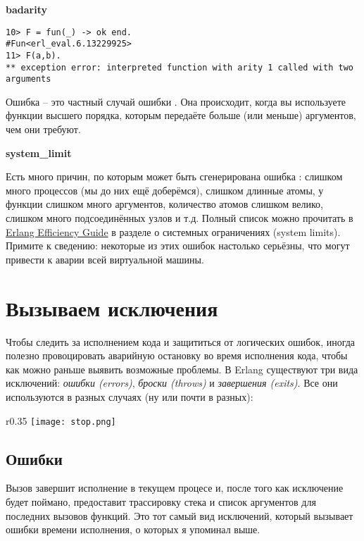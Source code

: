 \textbf{badarity}
\begin{lstlisting}[style=erlang]
10> F = fun(_) -> ok end.
#Fun<erl_eval.6.13229925>
11> F(a,b).
** exception error: interpreted function with arity 1 called with two arguments
\end{lstlisting}

Ошибка  \--- это частный случай ошибки . 
Она происходит, когда вы используете функции высшего порядка, которым передаёте больше (или меньше) аргументов, чем они требуют.
\blankline

\textbf{system\_limit}

Есть много причин, по которым может быть сгенерирована ошибка : слишком много процессов (мы до них ещё доберёмся), слишком длинные атомы, у функции слишком много аргументов, количество атомов слишком велико, слишком много подсоединённых узлов и т.д.
Полный список можно прочитать в \href{http://www.erlang.org/doc/efficiency_guide/advanced.html#id2265856}{Erlang Efficiency Guide} в разделе о системных ограничениях (system limits).
Примите к сведению: некоторые из этих ошибок настолько серьёзны, что могут привести к аварии всей виртуальной машины.

\section{Вызываем исключения}
\label{raising-exceptions}
Чтобы следить за исполнением кода и защититься от логических ошибок, иногда полезно провоцировать аварийную остановку во время исполнения кода, чтобы как можно раньше выявить возможные проблемы.
В Erlang существуют три вида исключений: \emph{ошибки (errors)}, \emph{броски (throws)} и \emph{завершения (exits)}. Все они используются в разных случаях (ну или почти в разных):

\begin{wrapfigure}{r}{0.35\linewidth}
    \texttt{[image: stop.png]}
\end{wrapfigure}

\subsection{Ошибки}
\label{errors}
Вызов  завершит исполнение в текущем процесе и, после того как исключение будет поймано, предоставит трассировку стека и список аргументов для последних вызовов функций.
Это тот самый вид исключений, который вызывает ошибки времени исполнения, о которых я упоминал выше.

